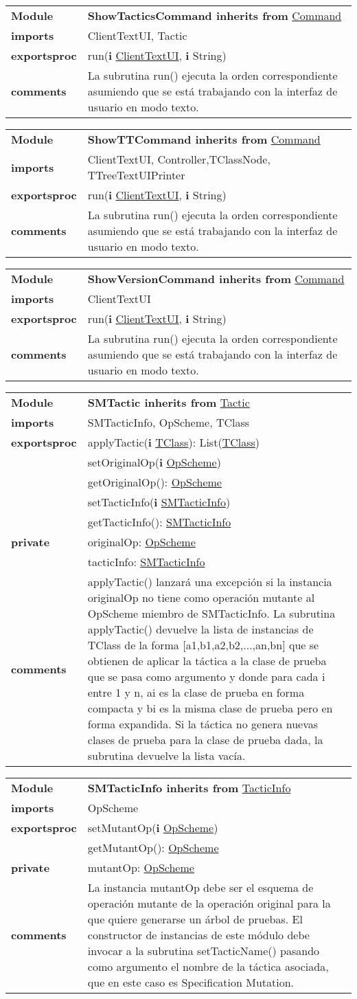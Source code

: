 \documentclass[12pt,a4paper,fleqn]{report}
\newenvironment{hmodule}[2]{\hypertarget{mi:#1}{} \vspace{0.5cm}\noindent\begin{tabular}{|p{0.2\textwidth} p{0.75\textwidth}|} \hline{\bf Module} & {\bf #1 inherits from} \hyperlink{mi:#2}{#2} \\}{\hline\end{tabular}\vspace{0.5cm}}
\newcommand{\eproc}{{\bf exportsproc}}
\newcommand{\priv}{{\bf private}}
\newcommand{\proc}[1]{& #1 \\}
\newcommand{\e}[1]{{\bf i} \hyperlink{mi:#1}{#1}}
\newcommand{\eb}[1]{{\bf i} #1}
\newcommand{\imp}[1]{{\bf imports} & #1 \\}
\newcommand{\comm}[1]{{\bf comments} & #1 \\}
\newcommand{\mdr}[1]{\hyperlink{mi:#1}{#1}}
\begin{document}
\begin{hmodule}{ShowTacticsCommand}{Command}
\imp{ClientTextUI, Tactic}
\eproc
\proc{run(\e {ClientTextUI}, \eb {String})}
\comm{La subrutina run() ejecuta la orden correspondiente asumiendo que se está trabajando con la interfaz de usuario en modo texto.}
\end{hmodule}





\begin{hmodule}{ShowTTCommand}{Command}
\imp{ClientTextUI, Controller,TClassNode, TTreeTextUIPrinter}
\eproc
\proc{run(\e {ClientTextUI}, \eb {String})}
\comm{La subrutina run() ejecuta la orden correspondiente asumiendo que se está trabajando con la interfaz de usuario en modo texto.}
\end{hmodule}



\begin{hmodule}{ShowVersionCommand}{Command}
\imp{ClientTextUI}
\eproc
\proc{run(\e {ClientTextUI}, \eb {String})}
\comm{La subrutina run() ejecuta la orden correspondiente asumiendo que se está trabajando con la interfaz de usuario en modo texto.}
\end{hmodule}



\begin{hmodule}{SMTactic}{Tactic}
\imp{SMTacticInfo, OpScheme, TClass}
\eproc
\proc{applyTactic(\e {TClass}): List(\mdr{TClass})}
\proc{setOriginalOp(\e {OpScheme})}
\proc{getOriginalOp(): \mdr{OpScheme}}
\proc{setTacticInfo(\e {SMTacticInfo})}
\proc{getTacticInfo(): \mdr{SMTacticInfo}}
\priv
\proc{originalOp: \mdr{OpScheme}}
\proc{tacticInfo: \mdr{SMTacticInfo}}
\comm{applyTactic() lanzará una excepción si la instancia originalOp no tiene como operación mutante al OpScheme miembro de SMTacticInfo. La subrutina applyTactic() devuelve la lista de instancias de TClass de la forma [a1,b1,a2,b2,...,an,bn] que se obtienen de aplicar la táctica a la clase de prueba que se pasa como argumento y donde para cada i entre 1 y n, ai es la clase de prueba en forma compacta y bi es la misma clase de prueba pero en forma expandida. Si la táctica no genera nuevas clases de prueba para la clase de prueba dada, la subrutina devuelve la lista vacía.}
\end{hmodule}



\begin{hmodule}{SMTacticInfo}{TacticInfo}
\imp{OpScheme}
\eproc
\proc{setMutantOp(\e {OpScheme})}
\proc{getMutantOp(): \mdr{OpScheme}}
\priv
\proc{mutantOp: \mdr{OpScheme}}
\comm{La instancia mutantOp debe ser el esquema de operación mutante de la operación original para la que quiere generarse un árbol de pruebas. El constructor de instancias de este módulo debe invocar a la subrutina setTacticName() pasando como argumento el nombre de la táctica asociada, que en este caso es Specification Mutation.}
\end{hmodule}
\end{document}
